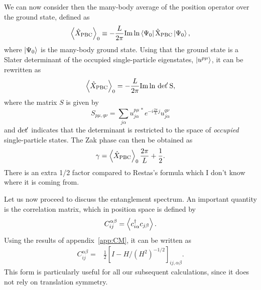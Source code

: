 \documentclass[twocolumn,amsmath,longbibliography,amssymb,superscriptaddress]{revtex4-1}
\newcommand{\carlos}[1]{{\color{red} #1}}
\begin{document}
We can now consider then the many-body average of the position operator over the ground state, defined as
\begin{align}
\expval{\hat{X}_{\rm PBC}}_0 \equiv -\frac{L}{2\pi} \rm{ Im }\ln\bra{\Psi_0}\hat{X}_{\rm PBC}\ket{\Psi_0},
\end{align}
where $\ket{\Psi_0}$ is the many-body ground state. 
Using that the ground state is a Slater determinant of the occupied single-particle eigenstates, $\ket{u^{p\mu}}$, it can be rewritten as~\cite{Resta1997}
\begin{align}
\expval{\hat{X}_{\rm PBC}}_0 = -\frac{L}{2\pi} \rm{Im }\ln \, {\rm det }\!' \, S,
\end{align}
where the matrix $S$ is given by
\begin{equation}
S_{p\mu,q\nu} = \sum_{j\alpha} u^{p\mu\, \ast}_{j \alpha} e^{-i\frac{2\pi}{L}j}u^{q\nu}_{j \alpha}
\end{equation}
and  ${\rm det }\!' $ indicates that the determinant is restricted to the space of \emph{occupied} single-particle states. 
The Zak phase can then be obtained as
\begin{equation}
\gamma = \expval{\hat{X}_{\rm PBC}}_0\frac{2\pi}{L} + \frac{1}{2}.
\end{equation}
\carlos{There is an extra 1/2 factor compared to Restas's formula which I don't know where it is coming from.}

Let us now proceed to discuss the entanglement spectrum. 
An important quantity is the correlation matrix, which in position space is defined by
\begin{align}
C_{ij}^{\alpha \beta} = \expval{c_{i\alpha}^\dagger c_{j\beta}}.
\end{align}
Using the results of appendix~\ref{app:CM}, it  can be written  as
\begin{align}\label{eq:corr_mat2}
C_{ij}^{\alpha \beta} =& \frac{1}{2}\left[I - H/ (H^2)^{-1/2} \right]_{ij, \alpha \beta}.
\end{align}
This form is particularly useful for all our subsequent calculations, since it does not rely on translation symmetry. 
\end{document}
